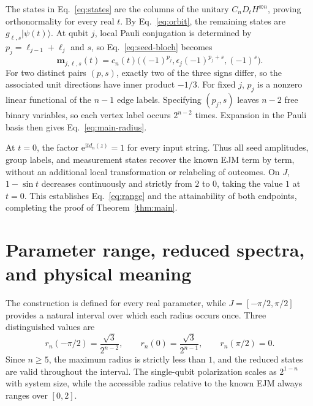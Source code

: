 \documentclass[11pt,a4paper]{article}
\numberwithin{equation}{section}
\theoremstyle{definition}
\newcommand{\ii}{\mathrm i}
\newcommand{\ee}{\mathrm e}
\newcommand{\ket}[1]{\lvert#1\rangle}
\begin{document}
The states in Eq.~\eqref{eq:states} are the columns of the unitary $C_nD_tH^{\otimes n}$, proving orthonormality for every real $t$. By Eq.~\eqref{eq:orbit}, the remaining states are $g_{\ell,s}\ket{\psi(t)}$. At qubit $j$, local Pauli conjugation is determined by $p_j=\ell_{j-1}+\ell_j$ and $s$, so Eq.~\eqref{eq:seed-bloch} becomes
\begin{equation}
 \bm m_{j,\ell,s}(t)
 =c_n(t)\bigl((-1)^{p_j},\epsilon_j(-1)^{p_j+s},(-1)^s\bigr).
\end{equation}
For two distinct pairs $(p,s)$, exactly two of the three signs differ, so the associated unit directions have inner product $-1/3$. For fixed $j$, $p_j$ is a nonzero linear functional of the $n-1$ edge labels. Specifying $(p_j,s)$ leaves $n-2$ free binary variables, so each vertex label occurs $2^{n-2}$ times. Expansion in the Pauli basis then gives Eq.~\eqref{eq:main-radius}.

At $t=0$, the factor $\ee^{\ii t d_n(z)}=1$ for every input string. Thus all seed amplitudes, group labels, and measurement states recover the known EJM term by term, without an additional local transformation or relabeling of outcomes. On $J$, $1-\sin t$ decreases continuously and strictly from $2$ to $0$, taking the value $1$ at $t=0$. This establishes Eq.~\eqref{eq:range} and the attainability of both endpoints, completing the proof of Theorem~\ref{thm:main}.

\section{Parameter range, reduced spectra, and physical meaning}
\label{sec:physical}

The construction is defined for every real parameter, while $J=[-\pi/2,\pi/2]$ provides a natural interval over which each radius occurs once. Three distinguished values are
\begin{equation}
 r_n(-\pi/2)=\frac{\sqrt3}{2^{n-2}},\qquad
 r_n(0)=\frac{\sqrt3}{2^{n-1}},\qquad
 r_n(\pi/2)=0.
\end{equation}
Since $n\geq5$, the maximum radius is strictly less than $1$, and the reduced states are valid throughout the interval. The single-qubit polarization scales as $2^{1-n}$ with system size, while the accessible radius relative to the known EJM always ranges over $[0,2]$.
\end{document}
